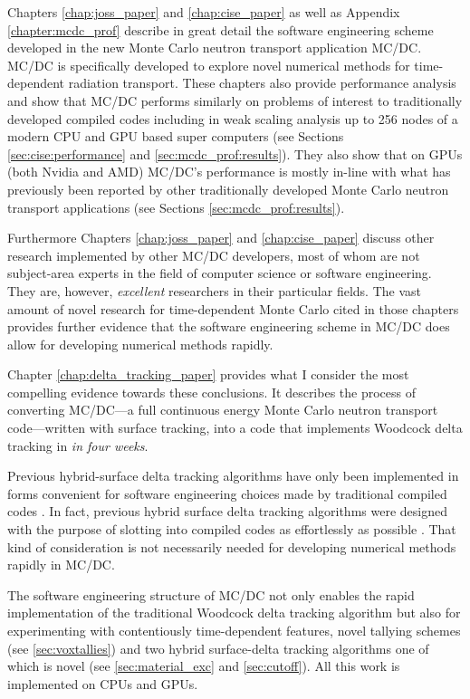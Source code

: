 Chapters \ref{chap:joss_paper} and \ref{chap:cise_paper} as well as Appendix \ref{chapter:mcdc_prof} describe in great detail the software engineering scheme developed in the new Monte Carlo neutron transport application MC/DC.
MC/DC is specifically developed to explore novel numerical methods for time-dependent radiation transport.
These chapters also provide performance analysis and show that MC/DC performs similarly on problems of interest to traditionally developed compiled codes including in weak scaling analysis up to 256 nodes of a modern CPU and GPU based super computers (see Sections \ref{sec:cise:performance} and \ref{sec:mcdc_prof:results}).
They also show that on GPUs (both Nvidia and AMD) MC/DC's performance is mostly in-line with what has previously been reported by other traditionally developed Monte Carlo neutron transport applications (see Sections \ref{sec:mcdc_prof:results}).

Furthermore Chapters \ref{chap:joss_paper} and \ref{chap:cise_paper} discuss other research implemented by other MC/DC developers, most of whom are not subject-area experts in the field of computer science or software engineering.
They are, however, \emph{excellent} researchers in their particular fields.
The vast amount of novel research for time-dependent Monte Carlo cited in those chapters provides further evidence that the software engineering scheme in MC/DC does allow for developing numerical methods rapidly.

Chapter \ref{chap:delta_tracking_paper} provides what I consider the most compelling evidence towards these conclusions.
It describes the process of converting MC/DC---a full continuous energy Monte Carlo neutron transport code---written with surface tracking, into a code that implements Woodcock delta tracking in \emph{in four weeks}.

Previous hybrid-surface delta tracking algorithms have only been implemented in forms convenient for software engineering choices made by traditional compiled codes \cite{leppanen_development_2013conf}.
In fact, previous hybrid surface delta tracking algorithms were designed with the purpose of slotting into compiled codes as effortlessly as possible \cite{morgan2023delta}.
That kind of consideration is not necessarily needed for developing numerical methods rapidly in MC/DC.

The software engineering structure of MC/DC not only enables the rapid implementation of the traditional Woodcock delta tracking algorithm but also for experimenting with contentiously time-dependent features, novel tallying schemes (see \ref{sec:voxtallies}) and two hybrid surface-delta tracking algorithms one of which is novel (see \ref{sec:material_exc} and \ref{sec:cutoff}).
All this work is implemented on CPUs and GPUs.

